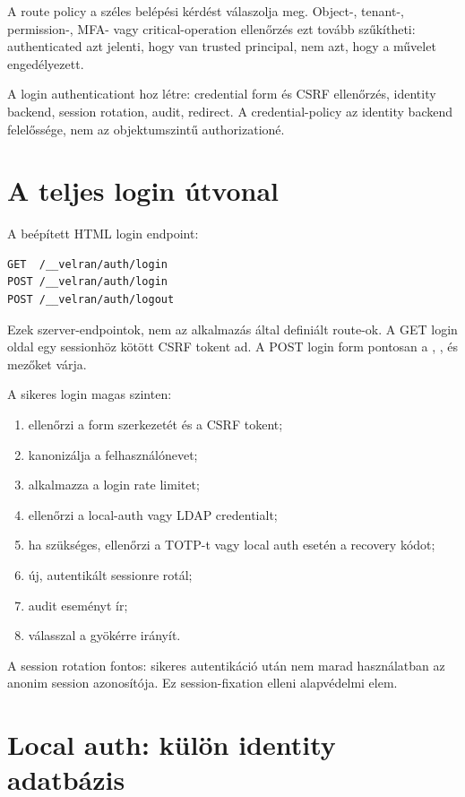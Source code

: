 A route policy a széles belépési kérdést válaszolja meg. Object-, tenant-, permission-, MFA- vagy critical-operation ellenőrzés ezt tovább szűkítheti: authenticated azt jelenti, hogy van trusted principal, nem azt, hogy a művelet engedélyezett.

A login authenticationt hoz létre: credential form és CSRF ellenőrzés, identity backend, session rotation, audit, redirect. A credential-policy az identity backend felelőssége, nem az objektumszintű authorizationé.

\section{A teljes login útvonal}

A beépített HTML login endpoint:

\begin{lstlisting}
GET  /__velran/auth/login
POST /__velran/auth/login
POST /__velran/auth/logout
\end{lstlisting}

Ezek szerver-endpointok, nem az alkalmazás által definiált route-ok. A GET login oldal egy sessionhöz kötött CSRF tokent ad. A POST login form pontosan a , ,  és  mezőket várja.

A sikeres login magas szinten:

\begin{enumerate}
  \item ellenőrzi a form szerkezetét és a CSRF tokent;
  \item kanonizálja a felhasználónevet;
  \item alkalmazza a login rate limitet;
  \item ellenőrzi a local-auth vagy LDAP credentialt;
  \item ha szükséges, ellenőrzi a TOTP-t vagy local auth esetén a recovery kódot;
  \item új, autentikált sessionre rotál;
  \item audit eseményt ír;
  \item {} válasszal a gyökérre irányít.
\end{enumerate}

A session rotation fontos: sikeres autentikáció után nem marad használatban az anonim session azonosítója. Ez session-fixation elleni alapvédelmi elem.

\section{Local auth: külön identity adatbázis}

